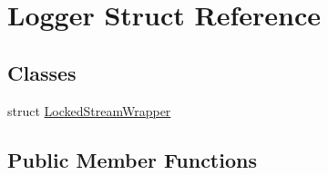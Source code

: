 \hypertarget{struct_logger}{
\section{Logger Struct Reference}
\label{struct_logger}
}
\subsection*{Classes}
\begin{DoxyCompactItemize}
\item 
struct \hyperlink{struct_logger_1_1_locked_stream_wrapper}{LockedStreamWrapper}
\end{DoxyCompactItemize}
\subsection*{Public Member Functions}
